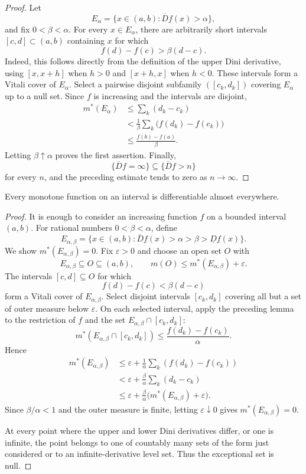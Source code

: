 \begin{proof}
Let
\[
E_\alpha=\{x\in(a,b):\overline D f(x)>\alpha\},
\]
and fix $0<\beta<\alpha$. For every $x\in E_\alpha$, there are arbitrarily short intervals $[c,d]\subset(a,b)$ containing $x$ for which
\[
f(d)-f(c)>\beta(d-c).
\]
Indeed, this follows directly from the definition of the upper Dini derivative, using $[x,x+h]$ when $h>0$ and $[x+h,x]$ when $h<0$. These intervals form a Vitali cover of $E_\alpha$. Select a pairwise disjoint subfamily $([c_k,d_k])$ covering $E_\alpha$ up to a null set. Since $f$ is increasing and the intervals are disjoint,
\[
\begin{aligned}
m^*(E_\alpha)
&\leq\sum_k(d_k-c_k)\\
&<\frac1\beta\sum_k\bigl(f(d_k)-f(c_k)\bigr)\\
&\leq\frac{f(b)-f(a)}\beta.
\end{aligned}
\]
Letting $\beta\uparrow\alpha$ proves the first assertion. Finally,
\[
\{\overline D f=\infty\}\subseteq\{\overline D f>n\}
\]
for every $n$, and the preceding estimate tends to zero as $n\to\infty$.
\end{proof}

\begin{thm}
Every monotone function on an interval is differentiable almost everywhere.
\end{thm}

\begin{proof}
It is enough to consider an increasing function $f$ on a bounded interval $(a,b)$. For rational numbers $0<\beta<\alpha$, define
\[
E_{\alpha,\beta}
 =\{x\in(a,b):\overline D f(x)>\alpha>\beta>\underline D f(x)\}.
\]
We show $m^*(E_{\alpha,\beta})=0$. Fix $\varepsilon>0$ and choose an open set $O$ with
\[
E_{\alpha,\beta}\subseteq O\subseteq(a,b),
\qquad m(O)\leq m^*(E_{\alpha,\beta})+\varepsilon.
\]
The intervals $[c,d]\subseteq O$ for which
\[
f(d)-f(c)<\beta(d-c)
\]
form a Vitali cover of $E_{\alpha,\beta}$. Select disjoint intervals $[c_k,d_k]$ covering all but a set of outer measure below $\varepsilon$. On each selected interval, apply the preceding lemma to the restriction of $f$ and the set $E_{\alpha,\beta}\cap[c_k,d_k]$:
\[
m^*(E_{\alpha,\beta}\cap[c_k,d_k])
 \leq \frac{f(d_k)-f(c_k)}\alpha.
\]
Hence
\[
\begin{aligned}
m^*(E_{\alpha,\beta})
&\leq \varepsilon+\frac1\alpha\sum_k(f(d_k)-f(c_k))\\
&<\varepsilon+\frac\beta\alpha\sum_k(d_k-c_k)\\
&\leq \varepsilon+\frac\beta\alpha\bigl(m^*(E_{\alpha,\beta})+\varepsilon\bigr).
\end{aligned}
\]
Since $\beta/\alpha<1$ and the outer measure is finite, letting $\varepsilon\downarrow0$ gives $m^*(E_{\alpha,\beta})=0$.

At every point where the upper and lower Dini derivatives differ, or one is infinite, the point belongs to one of countably many sets of the form just considered or to an infinite-derivative level set. Thus the exceptional set is null.
\end{proof}

